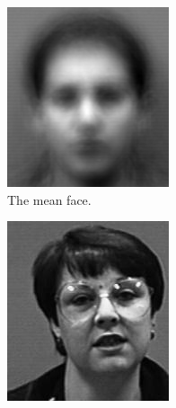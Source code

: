 \begin{figure}[H] %
\captionsetup[subfigure]{justification=centering}
\centering
\begin{subfigure}{.32\textwidth}
    \centering
    \includegraphics[width=\textwidth]{figures/meanFace.png}
    \caption{The mean face.}
    \label{fig:facerec-meanface}
\end{subfigure}
%
\begin{subfigure}{.32\textwidth}
    \centering
    \includegraphics[width=\textwidth]{figures/originalFace0.png}

\end{subfigure}
\end{figure}

